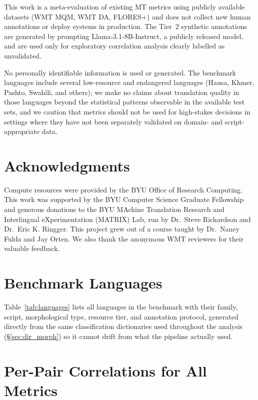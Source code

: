 \documentclass[11pt]{article}
\begin{document}
This work is a meta-evaluation of existing MT metrics using publicly available datasets (WMT MQM, WMT DA, FLORES+) and does not collect new human annotations or deploy systems in production.
The Tier~2 synthetic annotations are generated by prompting Llama-3.1-8B-Instruct, a publicly released model, and are used only for exploratory correlation analysis clearly labelled as unvalidated.

No personally identifiable information is used or generated.
The benchmark languages include several low-resource and endangered languages (Hausa, Khmer, Pashto, Swahili, and others); we make no claims about translation quality in those languages beyond the statistical patterns observable in the available test sets, and we caution that metrics should not be used for high-stakes decisions in settings where they have not been separately validated on domain- and script-appropriate data.

\section*{Acknowledgments}

Compute resources were provided by the BYU Office of Research Computing. This work was supported by the BYU Computer Science Graduate Fellowship and generous donations to the BYU MAchine Translation Research and Interlingual eXperimentation (MATRIX) Lab, run by Dr.\ Steve Richardson and Dr.\ Eric K. Ringger. This project grew out of a course taught by Dr.\ Nancy Fulda and Jay Orten. We also thank the anonymous WMT reviewers for their valuable feedback.



\clearpage
\onecolumn
\appendix

\section{Benchmark Languages}
\label{app:languages}

Table~\ref{tab:languages} lists all languages in the benchmark with their family, script, morphological type, resource tier, and annotation protocol, generated directly from the same classification dictionaries used throughout the analysis (\S\ref{sec:dir_morph}) so it cannot drift from what the pipeline actually used.



\section{Per-Pair Correlations for All Metrics}
\end{document}
